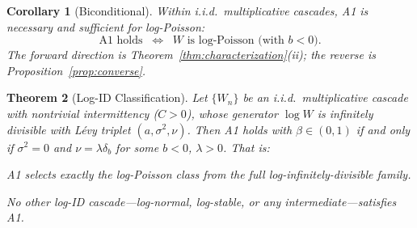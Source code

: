 \documentclass[pdflatex,sn-mathphys-num]{sn-jnl}
\theoremstyle{thmstyleone}
\newtheorem{theorem}{Theorem}
\newtheorem{corollary}[theorem]{Corollary}
\theoremstyle{thmstyletwo}
\theoremstyle{thmstylethree}
\begin{document}
\begin{corollary}[Biconditional]\label{cor:biconditional}
Within i.i.d.\ multiplicative cascades, A1 is necessary and
sufficient for log-Poisson:
\[
  \text{A1 holds}
  \;\;\Longleftrightarrow\;\;
  W \text{ is log-Poisson (with } b < 0\text{).}
\]
The forward direction is
Theorem~\textup{\ref{thm:characterization}(ii)}; the reverse is
Proposition~\textup{\ref{prop:converse}}.
\end{corollary}


\begin{theorem}[Log-ID Classification]\label{thm:classification}
Let $\{W_n\}$ be an i.i.d.\ multiplicative cascade with nontrivial
intermittency ($C > 0$), whose generator $\log W$ is infinitely
divisible with L\'evy triplet $(a, \sigma^2, \nu)$.  Then A1 holds
with $\beta \in (0,1)$ if and only if $\sigma^2 = 0$ and $\nu =
\lambda\delta_b$ for some $b < 0$, $\lambda > 0$.  That is:
\begin{center}
\emph{A1 selects exactly the log-Poisson class from the full
log-infinitely-divisible family.}
\end{center}
No other log-ID cascade---log-normal, log-stable, or any
intermediate---satisfies A1.
\end{theorem}
\end{document}
